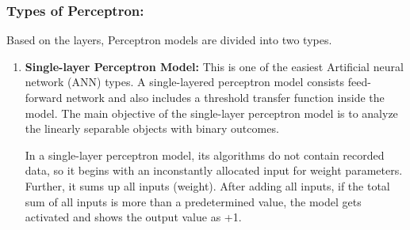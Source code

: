 \begin{itemize}
\end{itemize}

\subsubsection{Types of Perceptron:}
Based on the layers, Perceptron models are divided into two types.
\begin{enumerate}
    \item \textbf{Single-layer Perceptron Model: } This is one of the easiest Artificial neural network (ANN) types. A single-layered perceptron model consists feed-forward network and also includes a threshold transfer function inside the model. The main objective of the single-layer perceptron model is to analyze the linearly separable objects with binary outcomes.

    In a single-layer perceptron model, its algorithms do not contain recorded data, so it begins with an inconstantly allocated input for weight parameters. Further, it sums up all inputs (weight). After adding all inputs, if the total sum of all inputs is more than a predetermined value, the model gets activated and shows the output value as +1.
    

\end{enumerate}
